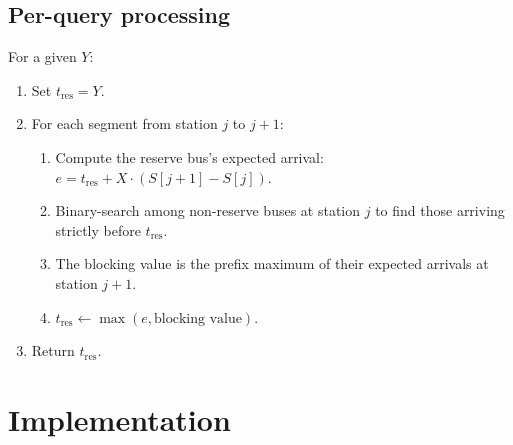 \documentclass[11pt,a4paper]{article}
\begin{document}
\subsection{Per-query processing}

For a given $Y$:
\begin{enumerate}
  \item Set $t_{\mathrm{res}} = Y$.
  \item For each segment from station $j$ to $j + 1$:
        \begin{enumerate}
          \item Compute the reserve bus's expected arrival:
                $e = t_{\mathrm{res}} + X \cdot (S[j{+}1] - S[j])$.
          \item Binary-search among non-reserve buses at station $j$ to find
                those arriving strictly before $t_{\mathrm{res}}$.
          \item The blocking value is the prefix maximum of their expected
                arrivals at station $j + 1$.
          \item $t_{\mathrm{res}} \gets \max(e, \text{blocking value})$.
        \end{enumerate}
  \item Return $t_{\mathrm{res}}$.
\end{enumerate}

\section{Implementation}
\end{document}
